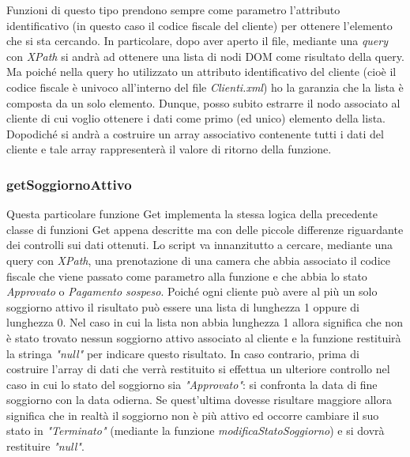 \documentclass [a4paper, 12pt]{book}
\begin{document}
Funzioni di questo tipo prendono sempre come parametro l'attributo identificativo (in questo caso il codice fiscale del cliente) per ottenere l'elemento che si sta cercando. In particolare, dopo aver aperto il file, mediante una \textit{query} con \textit{XPath} si andrà ad ottenere una lista di nodi DOM come risultato della query. Ma poiché nella query ho utilizzato un attributo identificativo del cliente (cioè il codice fiscale è univoco all'interno del file \textit{Clienti.xml}) ho la garanzia che la lista è composta da un solo elemento. Dunque, posso subito estrarre il nodo associato al cliente di cui voglio ottenere i dati come primo (ed unico) elemento della lista. Dopodiché si andrà a costruire un array associativo contenente tutti i dati del cliente e tale array rappresenterà il valore di ritorno della funzione.

\subsubsection{getSoggiornoAttivo}
Questa particolare funzione Get implementa la stessa logica della precedente classe di funzioni Get appena descritte ma con delle piccole differenze riguardante dei controlli sui dati ottenuti. Lo script va innanzitutto a cercare, mediante una query con \textit{XPath}, una prenotazione di una camera che abbia associato il codice fiscale che viene passato come parametro alla funzione e che abbia lo stato \textit{Approvato} o \textit{Pagamento sospeso}. Poiché ogni cliente può avere al più un solo soggiorno attivo il risultato può essere una lista di lunghezza 1 oppure di lunghezza 0. Nel caso in cui la lista non abbia lunghezza 1 allora significa che non è stato trovato nessun soggiorno attivo associato al cliente e la funzione restituirà la stringa \textit{"null"} per indicare questo risultato. In caso contrario, prima di costruire l'array di dati che verrà restituito si effettua un ulteriore controllo nel caso in cui lo stato del soggiorno sia \textit{"Approvato"}: si confronta la data di fine soggiorno con la data odierna. Se quest'ultima dovesse risultare maggiore allora significa che in realtà il soggiorno non è più attivo ed occorre cambiare il suo stato in \textit{"Terminato"} (mediante la funzione \textit{modificaStatoSoggiorno}) e si dovrà restituire \textit{"null"}.
\end{document}
